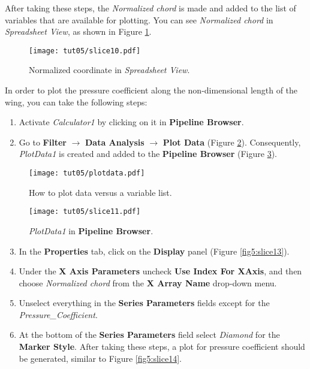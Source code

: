 After taking these steps, the \textit{Normalized chord} is made and added to the list of variables that are available for plotting. You can see \textit{Normalized chord} in \textit{Spreadsheet View}, as shown in Figure \ref{fig5:slice10}.
\begin{figure}[ht]
    \centering
    \texttt{[image: tut05/slice10.pdf]}
    \caption{Normalized coordinate in \textit{Spreadsheet View}.}
    \label{fig5:slice10}
\end{figure}

In order to plot the pressure coefficient along the non-dimensional length of the wing, you can take the following steps:
\begin{enumerate}[label=\arabic*)]
	\setcounter{enumi}{0}
	\item Activate \textit{Calculator1} by clicking on it in \textbf{Pipeline Browser}.
	\item Go to \textbf{Filter} $\rightarrow$ \textbf{Data Analysis} $\rightarrow$ \textbf{Plot Data} (Figure \ref{fig5:plotdata5}). Consequently, \textit{PlotData1} is created and added to the \textbf{Pipeline Browser} (Figure \ref{fig5:slice11}).
\end{enumerate}
\begin{figure}[ht]
    \centering
    \texttt{[image: tut05/plotdata.pdf]}
    \caption{How to plot data versus a variable list.}
    \label{fig5:plotdata5}
\end{figure}
\begin{figure}[H]
    \centering
    \texttt{[image: tut05/slice11.pdf]}
    \caption{\textit{PlotData1} in \textbf{Pipeline Browser}.}
    \label{fig5:slice11}
\end{figure}
\begin{enumerate}[label=\arabic*)]
	\setcounter{enumi}{2}
	\item In the \textbf{Properties} tab, click on the \textbf{Display} panel (Figure \ref{fig5:slice13}).
	\item Under the \textbf{X Axis Parameters} uncheck \textbf{Use Index For XAxis}, and then choose \textit{Normalized chord} from the \textbf{X Array Name} drop-down menu.
	\item Unselect everything in the \textbf{Series Parameters} fields except for the \textit{Pressure\_Coefficient}.
	\item At the bottom of the \textbf{Series Parameters} field select \textit{Diamond} for the \textbf{Marker Style}. After taking these steps, a plot for pressure coefficient should be generated, similar to Figure \ref{fig5:slice14}.
\end{enumerate}
